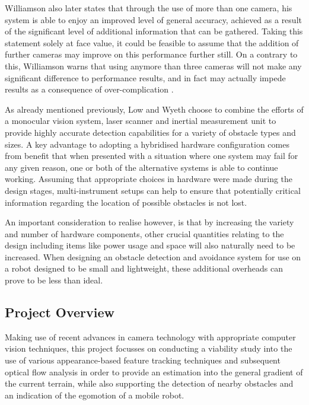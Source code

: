 Williamson also later states that through the use of more than one camera, his system is able to enjoy an improved level of general accuracy, achieved as a result of the significant level of additional information that can be gathered. Taking this statement solely at face value, it could be feasible to assume that the addition of further cameras may improve on this performance further still. On a contrary to this, Williamson warns that using anymore than three cameras will not make any significant difference to performance results, and in fact may actually impede results as a consequence of over-complication \cite{williamson}.

As already mentioned previously, Low and Wyeth \cite{low-wyeth} choose to combine the efforts of a monocular vision system, laser scanner and inertial measurement unit to provide highly accurate detection capabilities for a variety of obstacle types and sizes. A key advantage to adopting a hybridised hardware configuration comes from benefit that when presented with a situation where one system may fail for any given reason, one or both of the alternative systems is able to continue working. Assuming that appropriate choices in hardware were made during the design stages, multi-instrument setups can help to ensure that potentially critical information regarding the location of possible obstacles is not lost. 

An important consideration to realise however, is that by increasing the variety and number of hardware components, other crucial quantities relating to the design including items like power usage and space will also naturally need to be increased. When designing an obstacle detection and avoidance system for use on a robot designed to be small and lightweight, these additional overheads can prove to be less than ideal. 

\subsection{Project Overview}

Making use of recent advances in camera technology with appropriate computer vision techniques, this project focusses on conducting a viability study into the use of various appearance-based feature tracking techniques and subsequent optical flow analysis in order to provide an estimation into the general gradient of the current terrain, while also supporting the detection of nearby obstacles and an indication of the egomotion of a mobile robot. 

